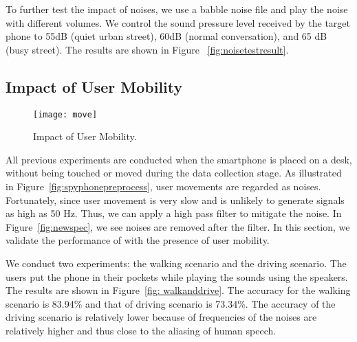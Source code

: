 To further test the impact of noises, we use a babble noise file and play the noise with different volumes. We control the sound pressure level received by the target phone to 55dB (quiet urban street), 60dB (normal conversation), and 65 dB (busy street). The results are shown in Figure ~\ref{fig:noisetestresult}.


\subsection{Impact of User Mobility}\label{sec:impact:move}
\begin{figure}[!h]
	\centering
	\texttt{[image: move]}
	\caption{Impact of User Mobility.}
	\label{fig:move}
\end{figure}
All previous experiments are conducted when the smartphone is placed on a desk, without being touched or moved during the data collection stage. As illustrated in Figure~\ref{fig:spyphonepreprocess}, user movements are regarded as noises. Fortunately, since user movement is very slow and is unlikely to generate signals as high as 50 Hz. Thus, we can apply a high pass filter to mitigate the noise. In Figure~\ref{fig:newspec}, we see noises are removed after the filter. In this section, we validate the performance of {\systemName} with the presence of user mobility. 

We conduct two experiments: the walking scenario and the driving scenario. The users put the phone in their pockets while playing the sounds using the speakers. The results are shown in Figure~\ref{fig: walkanddrive}. The accuracy for the walking scenario is 83.94\% and that of driving scenario is 73.34\%. The accuracy of the driving scenario is relatively lower because of frequencies of the noises are relatively higher and thus close to the aliasing of human speech.



